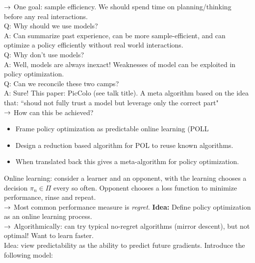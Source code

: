 $\rightarrow$ One goal: sample efficiency. We should spend time on planning/thinking before any real interactions. \\

Q: Why should we use models? \\

A: Can summarize past experience, can be more sample-efficient, and can optimize a policy efficiently without real world interactions. \\

Q: Why don't use models? \\

A: Well, models are always inexact! Weaknesses of model can be exploited in policy optimization. \\

Q: Can we reconcile these two camps? \\

A: Sure! This paper: PicColo (see talk title). A meta algorithm based on the idea that: ``shoud not fully trust a model but leverage only the correct part" \\

$\rightarrow$ How can this be achieved?
\begin{itemize}
    \item Frame policy optimization as predictable online learning (POLL
    \item Design a reduction based algorithm for POL to reuse known algorithms.
    \item When translated back this gives a meta-algorithm for policy optimization.
\end{itemize}

Online learning: consider a learner and an opponent, with the learning chooses a decision $\pi_n \in \Pi$ every so often. Opponent chooses a loss function to minimize performance, rinse and repeat. \\

$\rightarrow$ Most common performance measure is {\it regret}. {\bf Idea:} Define policy optimization as an online learning process. \\

$\rightarrow$ Algorithmically: can try typical no-regret algorithms (mirror descent), but not optimal! Want to learn faster. \\

Idea: view predictability as the ability to predict future gradients. Introduce the following model:


